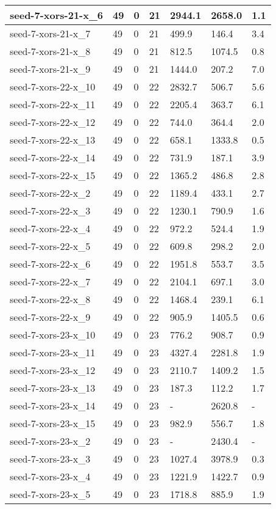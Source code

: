 \begin{scriptsize}
\begin{longtable}{|p{5cm}|l|l|l|l|l|l|}
seed-7-xors-21-x\_6&49&0&21&2944.1&2658.0&1.1 \\ \hline 
seed-7-xors-21-x\_7&49&0&21&499.9&146.4&3.4 \\ \hline 
seed-7-xors-21-x\_8&49&0&21&812.5&1074.5&0.8 \\ \hline 
seed-7-xors-21-x\_9&49&0&21&1444.0&207.2&7.0 \\ \hline 
seed-7-xors-22-x\_10&49&0&22&2832.7&506.7&5.6 \\ \hline 
seed-7-xors-22-x\_11&49&0&22&2205.4&363.7&6.1 \\ \hline 
seed-7-xors-22-x\_12&49&0&22&744.0&364.4&2.0 \\ \hline 
seed-7-xors-22-x\_13&49&0&22&658.1&1333.8&0.5 \\ \hline 
seed-7-xors-22-x\_14&49&0&22&731.9&187.1&3.9 \\ \hline 
seed-7-xors-22-x\_15&49&0&22&1365.2&486.8&2.8 \\ \hline 
seed-7-xors-22-x\_2&49&0&22&1189.4&433.1&2.7 \\ \hline 
seed-7-xors-22-x\_3&49&0&22&1230.1&790.9&1.6 \\ \hline 
seed-7-xors-22-x\_4&49&0&22&972.2&524.4&1.9 \\ \hline 
seed-7-xors-22-x\_5&49&0&22&609.8&298.2&2.0 \\ \hline 
seed-7-xors-22-x\_6&49&0&22&1951.8&553.7&3.5 \\ \hline 
seed-7-xors-22-x\_7&49&0&22&2104.1&697.1&3.0 \\ \hline 
seed-7-xors-22-x\_8&49&0&22&1468.4&239.1&6.1 \\ \hline 
seed-7-xors-22-x\_9&49&0&22&905.9&1405.5&0.6 \\ \hline 
seed-7-xors-23-x\_10&49&0&23&776.2&908.7&0.9 \\ \hline 
seed-7-xors-23-x\_11&49&0&23&4327.4&2281.8&1.9 \\ \hline 
seed-7-xors-23-x\_12&49&0&23&2110.7&1409.2&1.5 \\ \hline 
seed-7-xors-23-x\_13&49&0&23&187.3&112.2&1.7 \\ \hline 
seed-7-xors-23-x\_14&49&0&23&-&2620.8&- \\ \hline 
seed-7-xors-23-x\_15&49&0&23&982.9&556.7&1.8 \\ \hline 
seed-7-xors-23-x\_2&49&0&23&-&2430.4&- \\ \hline 
seed-7-xors-23-x\_3&49&0&23&1027.4&3978.9&0.3 \\ \hline 
seed-7-xors-23-x\_4&49&0&23&1221.9&1422.7&0.9 \\ \hline 
seed-7-xors-23-x\_5&49&0&23&1718.8&885.9&1.9 \\ \hline 

\end{longtable}
\end{scriptsize}
